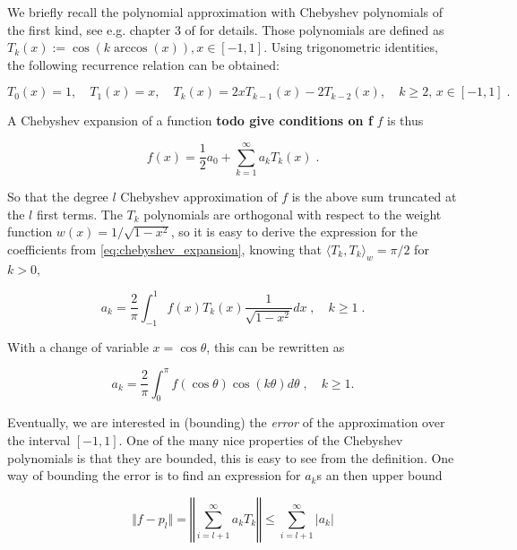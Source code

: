 \documentclass{article}
\begin{document}
We briefly recall the polynomial approximation with Chebyshev polynomials of the first kind, see e.g. chapter 3 of \cite{gil_numerical_2007} for details. Those polynomials are defined as $T_k(x) := \cos(k \arccos(x)), x \in [-1, 1]$. Using trigonometric identities, the following recurrence relation can be obtained:

\begin{equation*}
T_0(x) = 1, \quad T_1(x) = x, \quad T_k(x) = 2xT_{k-1}(x) - 2T_{k-2}(x), \quad k \ge 2, \, x \in [-1, 1] \; .    
\end{equation*}

A Chebyshev expansion of a function \textbf{todo give conditions on f} $f$ is thus

\begin{equation} \label{eq:chebyshev_expansion}
    f(x) = \frac 1 2 a_0 + \sum_{k=1}^\infty a_k T_k(x) \; .
\end{equation}

So that the degree $l$ Chebyshev approximation of $f$ is the above sum truncated at the $l$ first terms. The $T_k$ polynomials are orthogonal with respect to the weight function $w(x) = 1/\sqrt{1-x^2}$, so it is easy to derive the expression for the coefficients from \eqref{eq:chebyshev_expansion}, knowing that $\langle T_k, T_k\rangle _w = \pi/2$ for $k > 0$,

\begin{equation} \label{eq:chebyshev_coef}
    a_k = \frac{2}{\pi} \int_{-1}^1 f(x) T_k(x) \frac{1}{\sqrt{1-x^2}} dx \; , \quad k \ge 1 \; .
\end{equation}

With a change of variable $x = \cos \theta$, this can be rewritten as

\begin{equation} \label{eq:chebyshev_coef_cos}
    a_k = \frac{2}{\pi} \int_0^\pi f(\cos\theta) \cos(k\theta) d\theta \;, \quad k \ge 1 .
\end{equation}

Eventually, we are interested in (bounding) the \emph{error} of the approximation over the interval $[-1, 1]$. One of the many nice properties of the Chebyshev polynomials is that they are bounded, this is easy to see from the definition. One way of bounding the error is to find an expression for $a_k$s an then upper bound

\begin{equation*}
    \Vert f - p_l \Vert = \left\Vert \textstyle\sum_{i=l+1}^\infty a_k T_k \right\Vert \le \sum_{i=l+1}^\infty |a_k|
\end{equation*}
\end{document}
